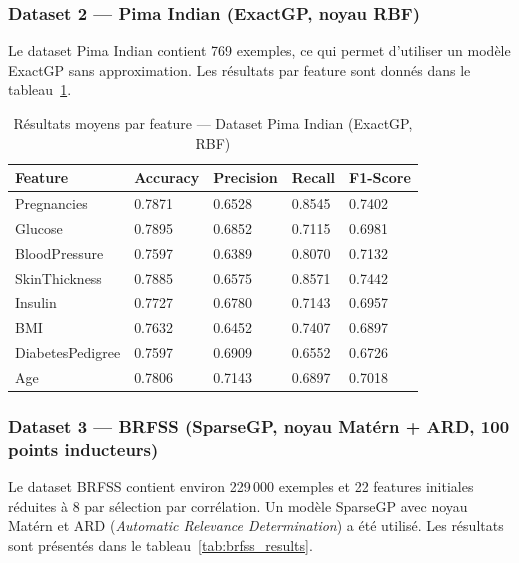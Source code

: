 \documentclass[12pt,a4paper]{article}
\begin{document}
\subsubsection*{Dataset 2 — Pima Indian (ExactGP, noyau RBF)}

Le dataset Pima Indian contient 769 exemples, ce qui permet d'utiliser un modèle ExactGP sans approximation. Les résultats par feature sont donnés dans le tableau~\ref{tab:pima_results}.

\begin{table}[H]
\centering
\caption{Résultats moyens par feature — Dataset Pima Indian (ExactGP, RBF)}
\label{tab:pima_results}
\small
\begin{tabular}{p{3.5cm}p{2.5cm}p{2.5cm}p{2.5cm}p{2.5cm}}
\hline
\textbf{Feature} & \textbf{Accuracy} & \textbf{Precision} & \textbf{Recall} & \textbf{F1-Score} \\
\hline
Pregnancies       & 0.7871 & 0.6528 & 0.8545 & 0.7402 \\
Glucose           & 0.7895 & 0.6852 & 0.7115 & 0.6981 \\
BloodPressure     & 0.7597 & 0.6389 & 0.8070 & 0.7132 \\
SkinThickness     & 0.7885 & 0.6575 & 0.8571 & 0.7442 \\
Insulin           & 0.7727 & 0.6780 & 0.7143 & 0.6957 \\
BMI               & 0.7632 & 0.6452 & 0.7407 & 0.6897 \\
DiabetesPedigree  & 0.7597 & 0.6909 & 0.6552 & 0.6726 \\
Age               & 0.7806 & 0.7143 & 0.6897 & 0.7018 \\
\hline
\end{tabular}
\end{table}

\subsubsection*{Dataset 3 — BRFSS (SparseGP, noyau Matérn + ARD, 100 points inducteurs)}

Le dataset BRFSS contient environ 229\,000 exemples et 22 features initiales réduites à 8 par sélection par corrélation. Un modèle SparseGP avec noyau Matérn et ARD (\textit{Automatic Relevance Determination}) a été utilisé. Les résultats sont présentés dans le tableau~\ref{tab:brfss_results}.
\end{document}
